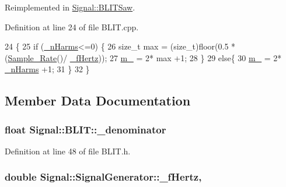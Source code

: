 Reimplemented in \hyperlink{class_signal_1_1_b_l_i_t_saw_ac2dd5e8cbd1797fe62aa0947e1fd1b9f}{Signal\+::\+B\+L\+I\+T\+Saw}.



Definition at line 24 of file B\+L\+I\+T.\+cpp.


\begin{DoxyCode}
24                             \{
25     \textcolor{keywordflow}{if} (\hyperlink{class_signal_1_1_b_l_i_t_a9ec3a46bd37f7d76a8924dd7dd3622bd}{\_nHarms}<=0) \{
26         \textcolor{keywordtype}{size\_t} max = (size\_t)floor(0.5 * (\hyperlink{namespace_signal_ae7b1f222afc010e0f33f306f978fcde9}{Sample\_Rate}()/ \hyperlink{class_signal_1_1_signal_generator_a85a4702347352bab1c71e0a8df8437d6}{\_fHertz}));
27         \hyperlink{class_signal_1_1_b_l_i_t_a8433b0437335d7834f17e4fa975ace1a}{m\_} = 2* max +1;
28     \}
29     \textcolor{keywordflow}{else}\{
30         \hyperlink{class_signal_1_1_b_l_i_t_a8433b0437335d7834f17e4fa975ace1a}{m\_} = 2* \hyperlink{class_signal_1_1_b_l_i_t_a9ec3a46bd37f7d76a8924dd7dd3622bd}{\_nHarms} +1;
31     \}
32 \}\end{DoxyCode}


\subsection{Member Data Documentation}
\hypertarget{class_signal_1_1_b_l_i_t_a0219d8bf4a3c9ba979824ae269363885}{
\subsubsection[{\+\_\+denominator}]{\setlength{\rightskip}{0pt plus 5cm}float Signal\+::\+B\+L\+I\+T\+::\+\_\+denominator\hspace{0.3cm}{\ttfamily [protected]}}}\label{class_signal_1_1_b_l_i_t_a0219d8bf4a3c9ba979824ae269363885}


Definition at line 48 of file B\+L\+I\+T.\+h.

\hypertarget{class_signal_1_1_signal_generator_a85a4702347352bab1c71e0a8df8437d6}{
\subsubsection[{\+\_\+f\+Hertz}]{\setlength{\rightskip}{0pt plus 5cm}double Signal\+::\+Signal\+Generator\+::\+\_\+f\+Hertz\hspace{0.3cm}{\ttfamily [protected]}, {\ttfamily [inherited]}}}\label{class_signal_1_1_signal_generator_a85a4702347352bab1c71e0a8df8437d6}


